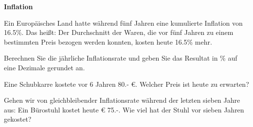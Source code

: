 
\bbwActAufgabenNr{} \textbf{Inflation}

 Ein Europäisches Land hatte während fünf Jahren eine kumulierte
 Inflation von 16.5\%. Das heißt: Der Durchschnitt der Waren, die vor fünf Jahren zu einem
 bestimmten Preis bezogen werden konnten, kosten heute 16.5\% mehr.
 
\begin{bbwAufgabenBlock}

\item Berechnen Sie die jährliche Inflationsrate und geben Sie das
  Resultat in \% auf eine Dezimale gerundet an.


    \item Eine Schubkarre kostete vor 6 Jahren 80.- \euro{}. Welcher
      Preis ist heute zu erwarten?

      
    \item Gehen wir von gleichbleibender Inflationsrate während der
      letzten sieben Jahre aus: Ein Bürostuhl kostet heute \euro{}
      75.-. Wie viel hat der Stuhl vor sieben Jahren gekostet?

      


      
\end{bbwAufgabenBlock}
\platzFuerBerechnungenBisEndeSeite{}




\newpage
